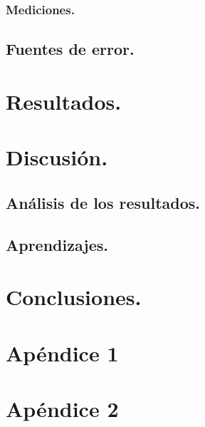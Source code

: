 \documentclass[12pt,a4paper]{article}
\begin{document}
	\subsubsection{ Mediciones.}

	
	\subsection{Fuentes de error.}
	
	
	\pagebreak

	\section{Resultados.} 
	
	
	\pagebreak
	
	\section{Discusión.}
	
	\subsection{Análisis de los resultados.}
	
	
	\subsection{Aprendizajes.}
	
	
	\pagebreak
	
	\section{Conclusiones.}
	 
	
	\pagebreak
	
	\appendix
	
	\section{Apéndice 1}
	
	
	\section{Apéndice 2}
	
	
\end{document}
